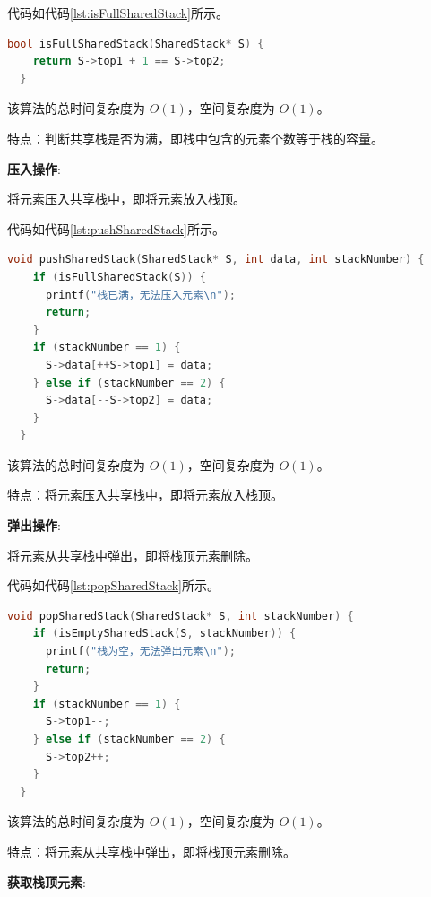 \documentclass[lang=cn,newtx,10pt,scheme=chinese]{../elegantbook}
\begin{document}
代码如代码\ref{lst:isFullSharedStack}所示。

\begin{lstlisting}[language=C++, caption={判断共享栈是否为满示例代码}, label={lst:isFullSharedStack}]
  bool isFullSharedStack(SharedStack* S) {
    return S->top1 + 1 == S->top2;
  }

\end{lstlisting}

该算法的总时间复杂度为 $O(1)$，空间复杂度为 $O(1)$。

特点：判断共享栈是否为满，即栈中包含的元素个数等于栈的容量。

\textbf{压入操作}:

将元素压入共享栈中，即将元素放入栈顶。

代码如代码\ref{lst:pushSharedStack}所示。

\begin{lstlisting}[language=C++, caption={压入共享栈示例代码}, label={lst:pushSharedStack}]
  void pushSharedStack(SharedStack* S, int data, int stackNumber) {
    if (isFullSharedStack(S)) {
      printf("栈已满，无法压入元素\n");
      return;
    }
    if (stackNumber == 1) {
      S->data[++S->top1] = data;
    } else if (stackNumber == 2) {
      S->data[--S->top2] = data;
    }
  }

\end{lstlisting}

该算法的总时间复杂度为 $O(1)$，空间复杂度为 $O(1)$。

特点：将元素压入共享栈中，即将元素放入栈顶。

\textbf{弹出操作}:

将元素从共享栈中弹出，即将栈顶元素删除。

代码如代码\ref{lst:popSharedStack}所示。

\begin{lstlisting}[language=C++, caption={弹出共享栈示例代码}, label={lst:popSharedStack}]
  void popSharedStack(SharedStack* S, int stackNumber) {
    if (isEmptySharedStack(S, stackNumber)) {
      printf("栈为空，无法弹出元素\n");
      return;
    }
    if (stackNumber == 1) {
      S->top1--;
    } else if (stackNumber == 2) {
      S->top2++;
    }
  }

\end{lstlisting}

该算法的总时间复杂度为 $O(1)$，空间复杂度为 $O(1)$。

特点：将元素从共享栈中弹出，即将栈顶元素删除。

\textbf{获取栈顶元素}:
\end{document}
